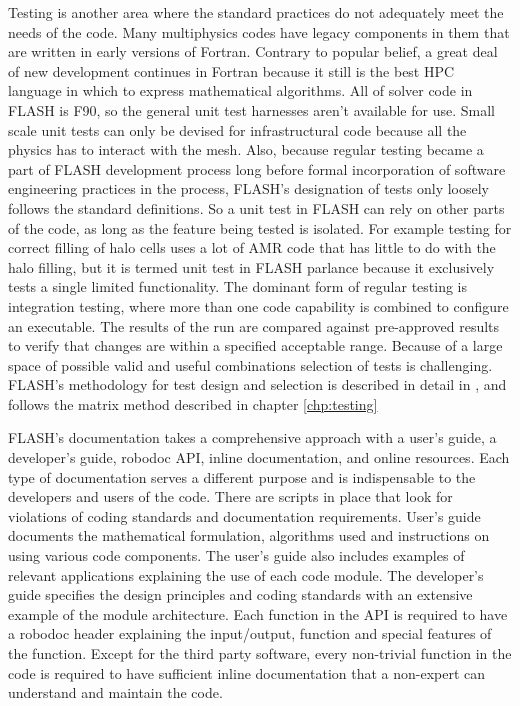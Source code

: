 Testing is another area where the standard practices do not adequately
meet the needs of the code. Many multiphysics codes have legacy
components in them that are written in early versions of
Fortran. Contrary to popular belief, a great deal of new development
continues in Fortran because it still is the best HPC language
in which to express mathematical algorithms. All of solver code in
FLASH is F90, so the general unit test harnesses aren't available for
use. Small scale unit tests can only be devised for infrastructural
code because all the physics has to interact with the mesh. Also,
because regular testing became a part of FLASH development process
long before formal incorporation of software engineering practices in
the process, FLASH's designation of tests only loosely follows the
standard definitions. So a unit test in FLASH can rely on other parts
of the code, as long as the feature being tested is isolated. For
example testing for correct filling of halo cells uses a lot of AMR
code that has little to do with the halo filling, but it is termed
unit test in FLASH parlance because it exclusively tests a single
limited functionality. The dominant form of regular testing is
integration testing, where more than one code capability is combined to
configure an executable. The results of the run are compared against
pre-approved results to verify that changes are within a specified
acceptable range. Because of a
large space of possible valid and useful combinations selection of tests
is challenging. FLASH's methodology for test design and
selection is described in detail in \cite{Dubey2015}, and follows the
matrix method described in chapter \ref{chp:testing}

FLASH's documentation takes a comprehensive approach with a
user's guide, a developer's guide, robodoc API, inline documentation,
and online resources. Each type of documentation serves a different
purpose and is indispensable to the developers and users of the code.  
There are scripts in place that look for violations of coding
standards and documentation requirements. User's guide documents the
mathematical formulation, algorithms used and instructions on using
various code components. The user's guide also includes examples of
relevant applications explaining the use of each code module. The
developer's guide specifies the design principles and coding standards
with an extensive example of the module architecture. Each function in
the API is required to have a robodoc header explaining the
input/output, function and special features of the function. Except
for the third party software, every non-trivial function in the code
is required to have sufficient inline documentation that a non-expert
can understand and maintain the code.

